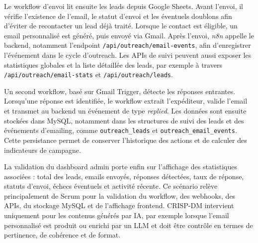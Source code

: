 Le workflow d'envoi lit ensuite les leads depuis Google Sheets. Avant l'envoi, il vérifie l'existence de l'email, le statut d'envoi et les éventuels doublons afin d'éviter de recontacter un lead déjà traité. Lorsque le contact est éligible, un email personnalisé est généré, puis envoyé via Gmail. Après l'envoi, \textit{n8n} appelle le backend, notamment l'endpoint \texttt{/api/outreach/email-events}, afin d'enregistrer l'événement dans le cycle d'outreach. Les APIs de suivi peuvent aussi exposer les statistiques globales et la liste détaillée des leads, par exemple à travers \texttt{/api/outreach/email-stats} et \texttt{/api/outreach/leads}.

Un second workflow, basé sur Gmail Trigger, détecte les réponses entrantes. Lorsqu'une réponse est identifiée, le workflow extrait l'expéditeur, valide l'email et transmet au backend un événement de type \textit{replied}. Les données sont ensuite stockées dans MySQL, notamment dans les structures de suivi des leads et des événements d'emailing, comme \texttt{outreach\_leads} et \texttt{outreach\_email\_events}. Cette persistance permet de conserver l'historique des actions et de calculer des indicateurs de campagne.

La validation du dashboard admin porte enfin sur l'affichage des statistiques associées : total des leads, emails envoyés, réponses détectées, taux de réponse, statuts d'envoi, échecs éventuels et activité récente. Ce scénario relève principalement de Scrum pour la validation du workflow, des webhooks, des APIs, du stockage MySQL et de l'affichage frontend. CRISP-DM intervient uniquement pour les contenus générés par IA, par exemple lorsque l'email personnalisé est produit ou enrichi par un LLM et doit être contrôle en termes de pertinence, de cohérence et de format.

